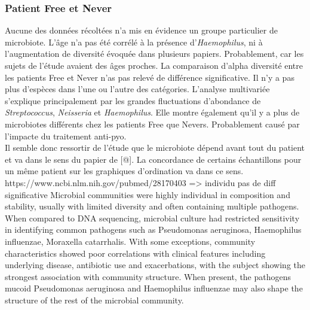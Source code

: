 \documentclass[12pt,a4paper]{article}
\begin{document}
\subsubsection{Patient Free et Never}
Aucune des données récoltées n’a mis en évidence un groupe particulier de microbiote. L’âge n’a pas été corrélé à la présence d’\textit{Haemophilus}, ni à l’augmentation de diversité évoquée dans plusieurs papiers. Probablement, car les sujets de l'étude avaient des âges proches. La comparaison d'alpha diversité entre les patients Free et Never n'as pas relevé de différence significative. Il n'y a pas plus d'espèces dans l'une ou l'autre des catégories.
L'analyse multivariée s'explique principalement par les grandes fluctuations d'abondance de \textit{Streptococcus}, \textit{Neisseria} et \textit{Haemophilus}. Elle montre également qu'il y a plus de microbiotes différents chez les patients Free que Nevers. Probablement causé par l'impacte du traitement anti-pyo.  \\
Il semble donc ressortir de l'étude que le microbiote dépend avant tout du patient et va dans le sens du papier de [@]. La concordance de certains échantillons pour un même patient sur les graphiques d'ordination va dans ce sens.
https://www.ncbi.nlm.nih.gov/pubmed/28170403 => individu pas de diff significative
Microbial communities were highly individual in composition and stability, usually with limited diversity and often containing multiple pathogens. When compared to DNA sequencing, microbial culture had restricted sensitivity in identifying common pathogens such as Pseudomonas aeruginosa, Haemophilus influenzae, Moraxella catarrhalis. With some exceptions, community characteristics showed poor correlations with clinical features including underlying disease, antibiotic use and exacerbations, with the subject showing the strongest association with community structure. When present, the pathogens mucoid Pseudomonas aeruginosa and Haemophilus influenzae may also shape the structure of the rest of the microbial community.
\end{document}
